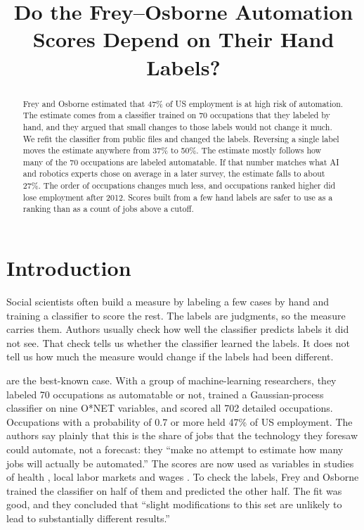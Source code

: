 \documentclass[11pt]{article}
\title{\vspace{-1.5em}Do the Frey--Osborne Automation Scores Depend on Their Hand Labels?}
\author{}
\date{}
\begin{document}
\maketitle
\vspace{-1.5em}

\begin{abstract}
\noindent Frey and Osborne estimated that 47\% of US employment is at high risk of automation. The
estimate comes from a classifier trained on 70 occupations that they labeled by hand, and they argued
that small changes to those labels would not change it much. We refit the classifier from public files
and changed the labels. Reversing a single label moves the estimate anywhere from 37\% to 50\%. The
estimate mostly follows how many of the 70 occupations are labeled automatable. If that number matches
what AI and robotics experts chose on average in a later survey, the estimate falls to about 27\%. The
order of occupations changes much less, and occupations ranked higher did lose employment after 2012.
Scores built from a few hand labels are safer to use as a ranking than as a count of jobs above a
cutoff.
\end{abstract}

\section{Introduction}
Social scientists often build a measure by labeling a few cases by hand and training a classifier to
score the rest. The labels are judgments, so the measure carries them. Authors usually check how well
the classifier predicts labels it did not see. That check tells us whether the classifier learned the
labels. It does not tell us how much the measure would change if the labels had been different.

\citet{frey2017} are the best-known case. With a group of machine-learning researchers, they labeled 70
occupations as automatable or not, trained a Gaussian-process classifier on nine O*NET variables, and
scored all 702 detailed occupations. Occupations with a probability of 0.7 or more held 47\% of US
employment. The authors say plainly that this is the share of jobs that the technology they foresaw
could automate, not a forecast: they ``make no attempt to estimate how many jobs will actually be
automated.'' The scores are now used as variables in studies of health \citep{patel2018}, local labor
markets \citep{frank2018} and wages \citep{fossen2022}. To check the labels, Frey and Osborne trained the
classifier on half of them and predicted the other half. The fit was good, and they concluded that
``slight modifications to this set are unlikely to lead to substantially different results.''
\end{document}
